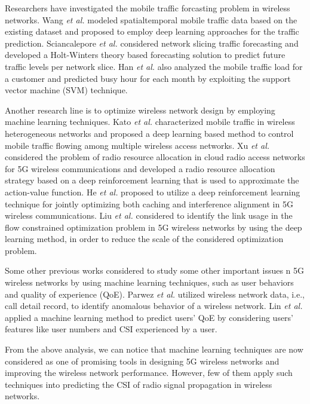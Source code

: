 \documentclass[10pt,journal,cspaper,compsoc]{IEEEtran}
\begin{document}
Researchers have investigated the mobile traffic forcasting problem in wireless networks. Wang \emph{et al.} \cite{WTXW17} modeled spatialtemporal mobile traffic data based on the existing dataset and proposed to employ deep learning approaches for the traffic prediction. Sciancalepore \emph{et al.} \cite{SSCB17} considered network slicing traffic forecasting and developed a Holt-Winters theory based forecasting solution to predict future traffic levels per network slice. Han \emph{et al.} \cite{HJQC09} also analyzed the mobile traffic load for a customer and predicted busy hour for each month by exploiting the support vector machine (SVM) technique.

Another research line is to optimize wireless network design by employing machine learning techniques. Kato \emph{et al.} \cite{KFMT17} characterized mobile traffic in wireless heterogeneous networks and proposed a deep learning based method to control mobile traffic flowing among multiple wireless access networks. Xu \emph{et al.} \cite{XWTW17} considered the problem of radio resource allocation in cloud radio access networks for 5G wireless communications and developed a radio resource allocation strategy based on a deep reinforcement learning that is used to approximate the action-value function. He \emph{et al.} \cite{HLYZ17,HZYZ17} proposed to utilize a deep reinforcement learning technique for jointly optimizing both caching and interference alignment in 5G wireless communications. Liu \emph{et al.} \cite{LCCZ17} considered to identify the link usage in the flow constrained optimization problem in 5G wireless networks by using the deep learning method, in order to reduce the scale of the considered optimization problem.

Some other previous works considered to study some other important issues n 5G wireless networks by using machine learning techniques, such as user behaviors and quality of experience (QoE). Parwez \emph{et al.} \cite{PRG17} utilized wireless network data, i.e., call detail record, to identify anomalous behavior of a wireless network. Lin \emph{et al.} \cite{LOJE17} applied a machine learning method to predict users' QoE by considering users' features like user numbers and CSI experienced by a user.

From the above analysis, we can notice that machine learning techniques are now considered as one of promising tools in designing 5G wireless networks and improving the wireless network performance. However, few of them apply such techniques into predicting the CSI of radio signal propagation in wireless networks.
\end{document}
